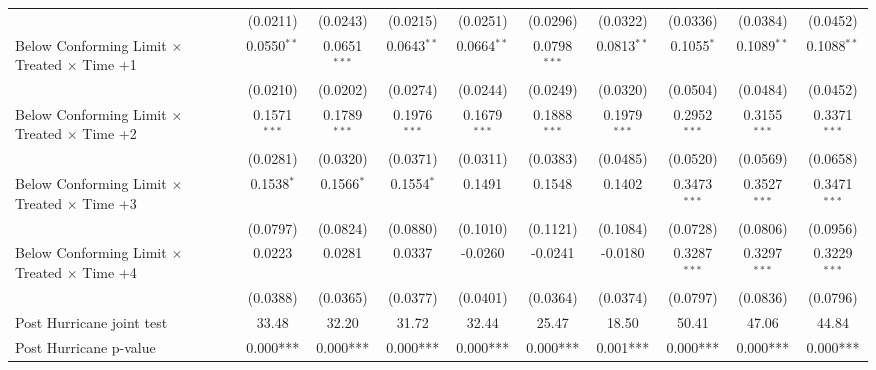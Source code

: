 \begin{tabular}{lccccccccc}
                                                              & (0.0211)       & (0.0243)       & (0.0215)       & (0.0251)       & (0.0296)       & (0.0322)       & (0.0336)       & (0.0384)       & (0.0452)\\   
   Below Conforming Limit $\times$ Treated $\times$ Time +1   & 0.0550$^{**}$  & 0.0651$^{***}$ & 0.0643$^{**}$  & 0.0664$^{**}$  & 0.0798$^{***}$ & 0.0813$^{**}$  & 0.1055$^{*}$   & 0.1089$^{**}$  & 0.1088$^{**}$\\   
                                                              & (0.0210)       & (0.0202)       & (0.0274)       & (0.0244)       & (0.0249)       & (0.0320)       & (0.0504)       & (0.0484)       & (0.0452)\\   
   Below Conforming Limit $\times$ Treated $\times$ Time +2   & 0.1571$^{***}$ & 0.1789$^{***}$ & 0.1976$^{***}$ & 0.1679$^{***}$ & 0.1888$^{***}$ & 0.1979$^{***}$ & 0.2952$^{***}$ & 0.3155$^{***}$ & 0.3371$^{***}$\\   
                                                              & (0.0281)       & (0.0320)       & (0.0371)       & (0.0311)       & (0.0383)       & (0.0485)       & (0.0520)       & (0.0569)       & (0.0658)\\   
   Below Conforming Limit $\times$ Treated $\times$ Time +3   & 0.1538$^{*}$   & 0.1566$^{*}$   & 0.1554$^{*}$   & 0.1491         & 0.1548         & 0.1402         & 0.3473$^{***}$ & 0.3527$^{***}$ & 0.3471$^{***}$\\   
                                                              & (0.0797)       & (0.0824)       & (0.0880)       & (0.1010)       & (0.1121)       & (0.1084)       & (0.0728)       & (0.0806)       & (0.0956)\\   
   Below Conforming Limit $\times$ Treated $\times$ Time +4   & 0.0223         & 0.0281         & 0.0337         & -0.0260        & -0.0241        & -0.0180        & 0.3287$^{***}$ & 0.3297$^{***}$ & 0.3229$^{***}$\\   
                                                              & (0.0388)       & (0.0365)       & (0.0377)       & (0.0401)       & (0.0364)       & (0.0374)       & (0.0797)       & (0.0836)       & (0.0796)\\   
   Post Hurricane joint test                                  & 33.48          & 32.20          & 31.72          & 32.44          & 25.47          & 18.50          & 50.41          & 47.06          & 44.84\\  
   Post Hurricane p-value                                     & 0.000***       & 0.000***       & 0.000***       & 0.000***       & 0.000***       & 0.001***       & 0.000***       & 0.000***       & 0.000***\\  

\end{tabular}
